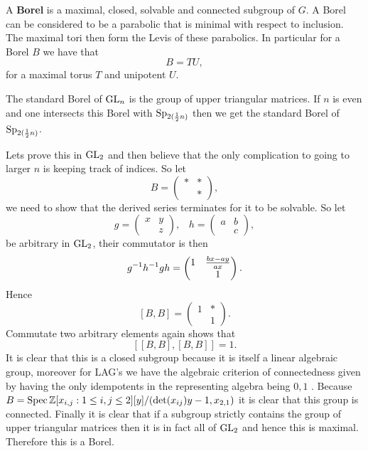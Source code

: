     A \textbf{Borel} is a maximal, closed, solvable and connected subgroup of \(G\). A Borel can be considered to be a parabolic that is minimal with respect to inclusion. The maximal tori then form the Levis of these parabolics. In particular for a Borel \(B\) we have that 
    \[B = TU,\]
    for a maximal torus \(T\) and unipotent \(U\).

    \begin{example}
        The standard Borel of \(\operatorname{GL}_n\) is the group of upper triangular matrices. If \(n\) is even and one intersects this Borel with \(\operatorname{Sp}_{2(\frac{1}{2}n)}\) then we get the standard Borel of \(\operatorname{Sp}_{2(\frac{1}{2}n)}\).

        Lets prove this in \(\operatorname{GL}_2\) and then believe that the only complication to going to larger \(n\) is keeping track of indices. So let 
        \[B = \begin{pmatrix}
            \ast & \ast \\
             & \ast
        \end{pmatrix},\]
        we need to show that the derived series terminates for it to be solvable. So let 
        \[g = \begin{pmatrix}
            x & y\\
             & z
        \end{pmatrix}, \;\;\; h = \begin{pmatrix}
            a & b \\
            & c
        \end{pmatrix},\]
        be arbitrary in \(\operatorname{GL}_2\), their commutator is then 
        \[g^{-1} h^{-1} gh =  \begin{pmatrix}
            1 & \frac{bx - ay}{ax} \\ & 1
        \end{pmatrix} .\]
        Hence
        \[[B, B] = \begin{pmatrix}
            1 & \ast \\ & 1
        \end{pmatrix}.\]
        Commutate two arbitrary elements again shows that  
        \[[[B, B], [B, B]] = 1.\]
    It is clear that this is a closed subgroup because it is itself a linear algebraic group, moreover for LAG's we have the algebraic criterion of connectedness given by having the only idempotents in the representing algebra being \(0, 1\) \cite[1.5]{getzIntroductionAutomorphicRepresentations2024}. Because \(B = \Spec \Z[x_{i,j}: 1\leq i,j\leq 2][y] / (\det(x_{ij})y - 1, x_{2,1})\) it is clear that this group is connected.     
    Finally it is clear that if a subgroup strictly contains the group of upper triangular matrices then it is in fact all of \(\operatorname{GL}_2\) and hence this is maximal. Therefore this is a Borel.
    \end{example}

